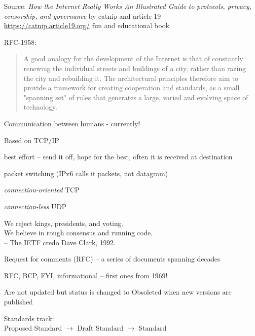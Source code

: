 \documentclass[Screen16to9,17pt]{foils}
\begin{document}
{\small Source: \emph{How the Internet Really Works
An Illustrated Guide to protocols, privacy, censorship, and governance} by catnip and article 19}\\
\url{https://catnip.article19.org/} {\color{red}\faHeart}
fun and educational book




RFC-1958:
\begin{quote}
 A good analogy for the development of the Internet is that of
 constantly renewing the individual streets and buildings of a city,
 rather than razing the city and rebuilding it. The architectural
 principles therefore aim to provide a framework for creating
 cooperation and standards, as a small "spanning set" of rules that
 generates a large, varied and evolving space of technology.
\end{quote}


\begin{list1}
\item Communication between humans - currently!
\item Based on TCP/IP
\begin{list2}
\item best effort -- send it off, hope for the best, often it is received at destination
\item packet switching (IPv6 calls it packets, not datagram)
\item \emph{connection-oriented} TCP
\item \emph{connection-less} UDP
\end{list2}
\end{list1}





{\hlkbig \color{titlecolor}
We reject kings, presidents, and voting.\\
We believe in rough consensus and running code.\\
-- The IETF credo Dave Clark, 1992.}

\begin{list1}
\item Request for comments (RFC) -- a series of documents spanning decades
\item RFC, BCP, FYI, informational -- first ones from 1969!
\item Are not updated but status is changed to Obsoleted when new versions are published
\item Standards track:\\
Proposed Standard $\rightarrow$ Draft Standard $\rightarrow$ Standard
\end{list1}
\end{document}
